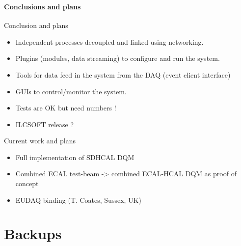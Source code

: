\documentclass[8pt]{beamer}
\begin{document}
  \begin{frame}
  \frametitle{\secname}
  \framesubtitle{Conclusions and plans}

  \begin{block}{Conclusion and plans}
    \begin{itemize}
      \item Independent processes decoupled and linked using networking.
      \item Plugins (modules, data streaming) to configure and run the system.
      \item Tools for data feed in the system from the DAQ (event client interface)
      \item GUIs to control/monitor the system.
      \item Tests are OK but need numbers !
      \item ILCSOFT release ?
    \end{itemize}
  \end{block}

  \begin{block}{Current work and plans}
    \begin{itemize}
      \item Full implementation of SDHCAL DQM
      \item Combined ECAL test-beam -> combined ECAL-HCAL DQM as proof of concept
      \item EUDAQ binding (T. Coates, Sussex, UK)
    \end{itemize}
  \end{block}

  \end{frame}

  \section*{Backups}
\end{document}

